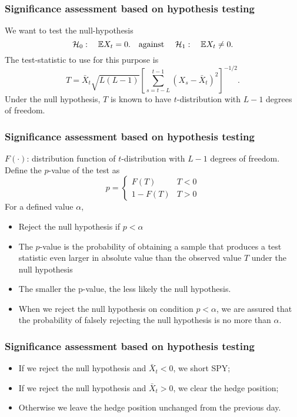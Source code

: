 \documentclass{beamer}
\begin{document}
\begin{frame}
  \frametitle{Significance assessment based on hypothesis testing}
  We want to test the null-hypothesis
  \[
    \mathcal H_0:\quad
    \mathbb{E} X_t = 0.
    \quad
    \text{against }
    \quad
    \mathcal H_1:\quad
    \mathbb{E} X_t \neq 0.
  \]
  The test-statistic to use for this purpose is
  \[
    T = \bar X_t \sqrt{L(L - 1)} \left[
      \sum_{s=t-L}^{t-1} (X_s - \bar X_t)^2
    \right]^{-1/2}.
  \]
  Under the null hypothesis, $T$ is known to have $t$-distribution
  with $L-1$ degrees of freedom.
\end{frame}

\begin{frame}
  \frametitle{Significance assessment based on hypothesis testing}
  $F(\cdot)$: distribution function of $t$-distribution with $L-1$
  degrees of freedom. Define the $p$-value of the test as
  \[
    p = \left\{
      \begin{array}{ll}
        F(T) & T < 0 \\
        1 - F(T) & T > 0
      \end{array}
    \right.
  \]
  For a defined value $\alpha$,
  \begin{itemize}
  \item Reject the null hypothesis if $p < \alpha$
  \item The $p$-value is the probability of obtaining a sample that
    produces a test statistic even larger in absolute value than the
    observed value $T$ under the null hypothesis
  \item The smaller the p-value, the less likely the null
    hypothesis.
  \item When we reject the null hypothesis on condition $p < \alpha$,
    we are assured that the probability of falsely rejecting the null
    hypothesis is no more than $\alpha$.
  \end{itemize}
\end{frame}

\begin{frame}
  \frametitle{Significance assessment based on hypothesis testing}
  \begin{itemize}
  \item If we reject the null hypothesis and $\bar X_t < 0$, we short
    SPY;
  \item If we reject the null hypothesis and $\bar X_t > 0$, we clear
    the hedge position;
  \item Otherwise we leave the hedge position unchanged from the
    previous day.
  \end{itemize}
\end{frame}
\end{document}
